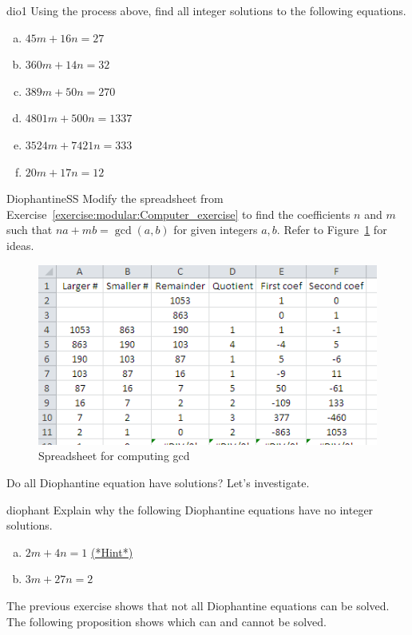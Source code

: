 \begin{exercise}{dio1}
Using the process above, find all integer solutions to the following equations.
\begin{enumerate} [(a)]
\item
$45m + 16n = 27$
\item
$360m + 14n = 32$
\item
$389m + 50n = 270$
\item
$4801m + 500n = 1337$
\item
$ 3524m + 7421n = 333$
\item
$20m + 17n = 12$
\end {enumerate}
\end {exercise}

\begin{exercise}{DiophantineSS}
Modify the spreadsheet from Exercise~\ref{exercise:modular:Computer_exercise} to find the coefficients $n$ and $m$ such that $na + mb = \gcd(a,b)$ for given integers $a,b$.  Refer to Figure~\ref{fig:gcd_spreadsheet_with_coefs} for ideas.
\end{exercise}

\begin{figure}[h]
\begin{center}
\includegraphics[width=4.5in]{images/gcd_spreadsheet_with_coefs.png}
\end{center}
\caption{Spreadsheet for computing gcd}\label{fig:gcd_spreadsheet_with_coefs}
\end{figure}


Do all  Diophantine equation have solutions? Let's investigate.

\begin{exercise}{diophant}
Explain why the following Diophantine equations have no integer solutions.
\begin{enumerate} [(a)]
\item
$2m + 4n = 1$
\hyperref[sec:modular_arithmetic:hints]{(*Hint*)}
\item
$3m + 27n = 2$
\end {enumerate}
\end {exercise}
The previous exercise shows that not all Diophantine equations can be solved.  The following proposition shows which can and cannot be solved.

